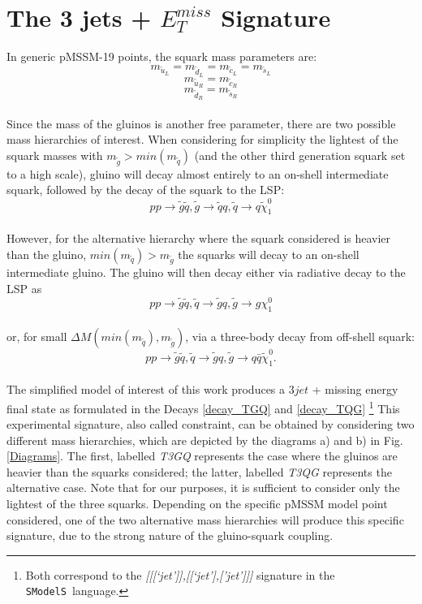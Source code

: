 \documentclass[preprint,number,sort&compress,twocolumn,3p]{elsstyarticle}
\newcommand{\SMO}{\texttt{SModelS\xspace}}
\begin{document}
\section{The 3 jets + $E_T ^{miss}$ Signature }\label{sec::T3GQ}
In generic pMSSM-19 points, the squark mass parameters are: 
\begin{equation*}
m_{\tilde u_L} = m_{\tilde d_L} = m_{\tilde c_L} = m_{\tilde s_L} 
\end{equation*}
\begin{equation*}
m_{\tilde u_R} = m_{\tilde c_R} 
\end{equation*}
\begin{equation*}
m_{\tilde d_R} = m_{\tilde s_R}
\end{equation*}
\\
Since the mass of the gluinos is another free parameter, there are two possible mass hierarchies of interest. 
When considering for simplicity the lightest of the squark masses with $m_{\tilde g} > min(m_{\tilde q})$ (and the other third generation squark set to a high scale), gluino will decay almost entirely to an on-shell intermediate squark, followed by the decay of the squark to the LSP:
\begin{equation}\label{decay_TGQ}
p p \rightarrow \tilde g \tilde q , \tilde g \rightarrow \tilde q q , \tilde q \rightarrow q \tilde \chi_1 ^0
\end{equation}
\\
However, for the alternative hierarchy where the squark considered is heavier than the gluino,  $ min(m_{\tilde q}) > m_{\tilde g}$ the squarks will decay to an on-shell intermediate gluino. The gluino will then decay either via radiative decay to the LSP as 
\begin{equation}\label{decay_loop}
p p \rightarrow \tilde g \tilde q ,\tilde q \rightarrow \tilde g q , \tilde g \rightarrow g \chi_1 ^0
\end{equation} 
\\
or, for small $\Delta M(min(m_{\tilde q}), m_{\tilde g})$,  via a three-body decay from off-shell squark:
\begin{equation}
p p \rightarrow \tilde g \tilde q ,\tilde q \rightarrow \tilde g q, \tilde g \rightarrow q \bar q \tilde \chi _1 ^0.
\end{equation}
\\
The simplified model of interest of this work produces a $3jet$ + missing energy final state as formulated in the Decays \ref{decay_TGQ} and \ref{decay_TQG} \footnote{Both correspond to the \textit{[[[`jet']],[[`jet'],['jet']]]} signature in the \SMO~language.} This experimental signature, also called constraint, can be obtained by considering two different mass hierarchies, which are depicted by the diagrams a) and b) in Fig. \ref{Diagrams}. The first, labelled \textit{T3GQ} represents the case where the gluinos are heavier than the squarks considered; the latter, labelled \textit{T3QG} represents the alternative case. Note that for our purposes, it is sufficient to consider only the lightest of the three squarks. Depending on the specific pMSSM model point considered, one of the two alternative mass hierarchies will produce this specific signature, due to the strong nature of the gluino-squark coupling.
\end{document}

